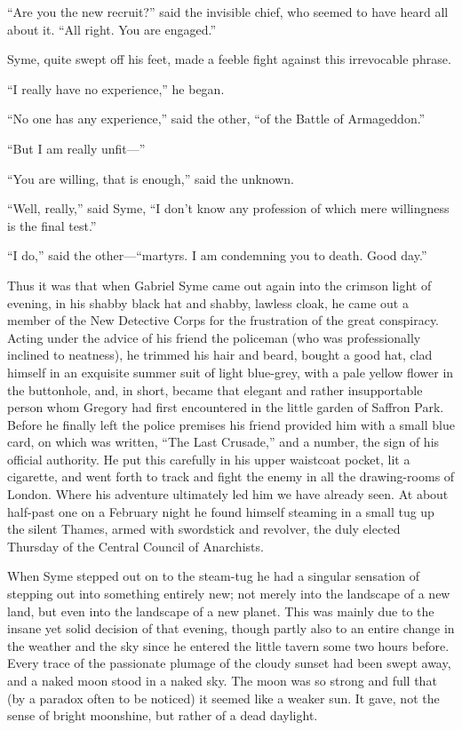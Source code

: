 “Are you the new recruit?” said the invisible chief, who seemed to have heard all about it. “All right. You are engaged.”

Syme, quite swept off his feet, made a feeble fight against this irrevocable phrase.

“I really have no experience,” he began.

“No one has any experience,” said the other, “of the Battle of Armageddon.”

“But I am really unfit⁠—”

“You are willing, that is enough,” said the unknown.

“Well, really,” said Syme, “I don’t know any profession of which mere willingness is the final test.”

“I do,” said the other⁠—“martyrs. I am condemning you to death. Good day.”

Thus it was that when Gabriel Syme came out again into the crimson light of evening, in his shabby black hat and shabby, lawless cloak, he came out a member of the New Detective Corps for the frustration of the great conspiracy. Acting under the advice of his friend the policeman (who was professionally inclined to neatness), he trimmed his hair and beard, bought a good hat, clad himself in an exquisite summer suit of light blue-grey, with a pale yellow flower in the buttonhole, and, in short, became that elegant and rather insupportable person whom Gregory had first encountered in the little garden of Saffron Park. Before he finally left the police premises his friend provided him with a small blue card, on which was written, “The Last Crusade,” and a number, the sign of his official authority. He put this carefully in his upper waistcoat pocket, lit a cigarette, and went forth to track and fight the enemy in all the drawing-rooms of London. Where his adventure ultimately led him we have already seen. At about half-past one on a February night he found himself steaming in a small tug up the silent Thames, armed with swordstick and revolver, the duly elected Thursday of the Central Council of Anarchists.

When Syme stepped out on to the steam-tug he had a singular sensation of stepping out into something entirely new; not merely into the landscape of a new land, but even into the landscape of a new planet. This was mainly due to the insane yet solid decision of that evening, though partly also to an entire change in the weather and the sky since he entered the little tavern some two hours before. Every trace of the passionate plumage of the cloudy sunset had been swept away, and a naked moon stood in a naked sky. The moon was so strong and full that (by a paradox often to be noticed) it seemed like a weaker sun. It gave, not the sense of bright moonshine, but rather of a dead daylight.

